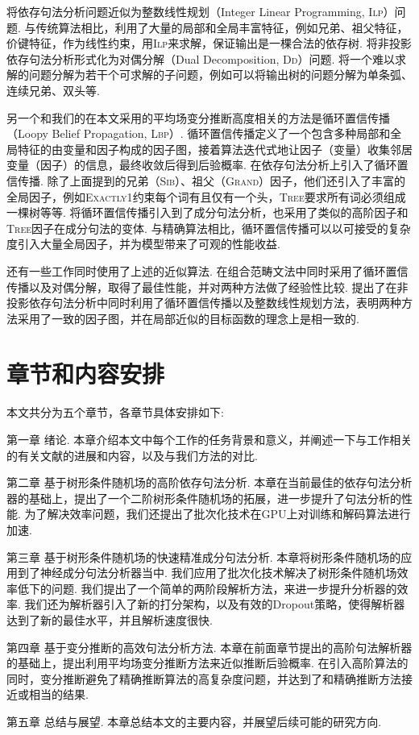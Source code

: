 \citet{martins-etal-2009-concise}将依存句法分析问题近似为整数线性规划（Integer Linear Programming, \textsc{Ilp}）问题.
与传统算法相比，\citet{martins-etal-2009-concise}利用了大量的局部和全局丰富特征，例如兄弟、祖父特征，价键特征，作为线性约束，用\textsc{Ilp}来求解，保证输出是一棵合法的依存树.
\citet{koo-etal-2010-dual}将非投影依存句法分析形式化为对偶分解（Dual Decomposition, \textsc{Dd}）问题.
将一个难以求解的问题分解为若干个可求解的子问题，例如可以将输出树的问题分解为单条弧、连续兄弟、双头等\citep{martins-etal-2011-dual}.

另一个和我们的在本文采用的平均场变分推断高度相关的方法是循环置信传播（Loopy Belief Propagation, \textsc{Lbp}）.
循环置信传播定义了一个包含多种局部和全局特征的由变量和因子构成的因子图，接着算法迭代式地让因子（变量）收集邻居变量（因子）的信息，最终收敛后得到后验概率.
\cite{smith-eisner-2008-dependency,gormley-etal-2015-approximation}在依存句法分析上引入了循环置信传播.
除了上面提到的兄弟（\textsc{Sib}）、祖父（\textsc{Grand}）因子，他们还引入了丰富的全局因子，例如\textsc{Exactly1}约束每个词有且仅有一个头，\textsc{Tree}要求所有词必须组成一棵树等等.
\citet{naradowsky-etal-2012-grammarless}将循环置信传播引入到了成分句法分析，也采用了类似的高阶因子和\textsc{Tree}因子在成分句法的变体.
与精确算法相比，循环置信传播可以以可接受的复杂度引入大量全局因子，并为模型带来了可观的性能收益.

还有一些工作同时使用了上述的近似算法.
\citet{auli-lopez-2011-comparison}在组合范畴文法中同时采用了循环置信传播\citep{smith-eisner-2008-dependency}以及对偶分解\citet{koo-etal-2010-dual}，取得了最佳性能，并对两种方法做了经验性比较.
\citet{martins-etal-2010-turbo}提出了在非投影依存句法分析中同时利用了循环置信传播\citep{smith-eisner-2008-dependency}以及整数线性规划\citep{martins-etal-2009-concise}方法，表明两种方法采用了一致的因子图，并在局部近似的目标函数的理念上是相一致的.

\section{章节和内容安排}

本文共分为五个章节，各章节具体安排如下:

第一章 绪论. 本章介绍本文中每个工作的任务背景和意义，并阐述一下与工作相关的有关文献的进展和内容，以及与我们方法的对比.

第二章 基于树形条件随机场的高阶依存句法分析.
本章在当前最佳的依存句法分析器的基础上，提出了一个二阶树形条件随机场的拓展，进一步提升了句法分析的性能.
为了解决效率问题，我们还提出了批次化技术在GPU上对训练和解码算法进行加速.

第三章 基于树形条件随机场的快速精准成分句法分析.
本章将树形条件随机场的应用到了神经成分句法分析器当中.
我们应用了批次化技术解决了树形条件随机场效率低下的问题.
我们提出了一个简单的两阶段解析方法，来进一步提升分析器的效率.
我们还为解析器引入了新的打分架构，以及有效的Dropout策略，使得解析器达到了新的最佳水平，并且解析速度很快.

第四章 基于变分推断的高效句法分析方法.
本章在前面章节提出的高阶句法解析器的基础上，提出利用平均场变分推断方法来近似推断后验概率.
在引入高阶算法的同时，变分推断避免了精确推断算法的高复杂度问题，并达到了和精确推断方法接近或相当的结果.

第五章 总结与展望. 本章总结本文的主要内容，并展望后续可能的研究方向.